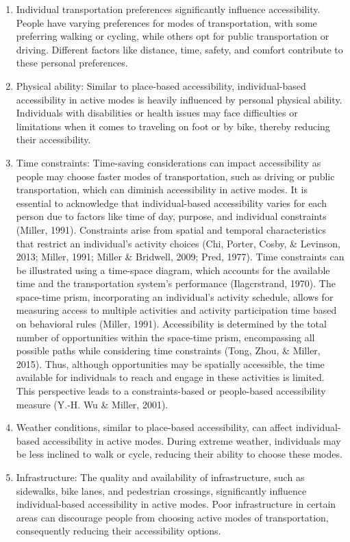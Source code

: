 \documentclass[
11pt, %
oneside, %
english, %
singlespacing, %
]{macthesis} %
\begin{document}
\begin{enumerate}
\def\labelenumi{\arabic{enumi}.}
\item
  Individual transportation preferences significantly influence accessibility. People have varying preferences for modes of transportation, with some preferring walking or cycling, while others opt for public transportation or driving. Different factors like distance, time, safety, and comfort contribute to these personal preferences.
\item
  Physical ability: Similar to place-based accessibility, individual-based accessibility in active modes is heavily influenced by personal physical ability. Individuals with disabilities or health issues may face difficulties or limitations when it comes to traveling on foot or by bike, thereby reducing their accessibility.
\item
  Time constraints: Time-saving considerations can impact accessibility as people may choose faster modes of transportation, such as driving or public transportation, which can diminish accessibility in active modes. It is essential to acknowledge that individual-based accessibility varies for each person due to factors like time of day, purpose, and individual constraints (Miller, 1991). Constraints arise from spatial and temporal characteristics that restrict an individual's activity choices (Chi, Porter, Cosby, \& Levinson, 2013; Miller, 1991; Miller \& Bridwell, 2009; Pred, 1977). Time constraints can be illustrated using a time-space diagram, which accounts for the available time and the transportation system's performance (Ilagcrstrand, 1970). The space-time prism, incorporating an individual's activity schedule, allows for measuring access to multiple activities and activity participation time based on behavioral rules (Miller, 1991). Accessibility is determined by the total number of opportunities within the space-time prism, encompassing all possible paths while considering time constraints (Tong, Zhou, \& Miller, 2015). Thus, although opportunities may be spatially accessible, the time available for individuals to reach and engage in these activities is limited. This perspective leads to a constraints-based or people-based accessibility measure (Y.-H. Wu \& Miller, 2001).
\item
  Weather conditions, similar to place-based accessibility, can affect individual-based accessibility in active modes. During extreme weather, individuals may be less inclined to walk or cycle, reducing their ability to choose these modes.
\item
  Infrastructure: The quality and availability of infrastructure, such as sidewalks, bike lanes, and pedestrian crossings, significantly influence individual-based accessibility in active modes. Poor infrastructure in certain areas can discourage people from choosing active modes of transportation, consequently reducing their accessibility options.
\end{enumerate}
\end{document}
